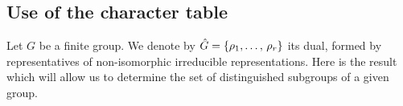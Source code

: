 \subsection{Use of the character table}
 
 Let $ G $ be a finite group. We denote by $ \hat{G} = \{\rho_1, \ldots, \, \rho_r\} $ its dual, formed by representatives of non-isomorphic irreducible representations. Here is the result which will allow us to determine the set of distinguished subgroups of a given group.
 
